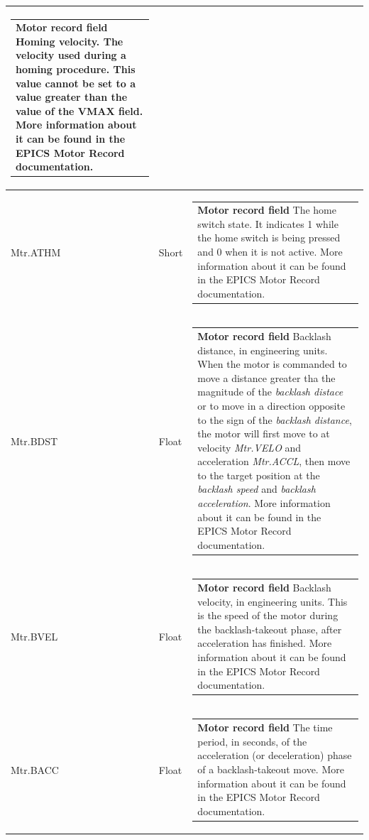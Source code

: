 \documentclass[openany]{article}
\begin{document}
\begin{longtable}{| m{4.5cm} m{2.5cm}  m{8.5cm} |}
\begin{tabular}{@{}m{6cm}@{}}
                \textbf{\color{ForestGreen} Motor record field} Homing velocity. The velocity used during a homing procedure. This value cannot be set to a value greater than the value of the VMAX field. More information about it can be found in the EPICS Motor Record documentation.
            \end{tabular} \hypertarget{pv:mtr-athm}{}\\ \hline
        Mtr.ATHM & Short & \begin{tabular}{@{}m{6cm}@{}}
                \textbf{\color{ForestGreen} Motor record field} The home switch state. It indicates 1 while the home switch is being pressed and 0 when it is not active. More information about it can be found in the EPICS Motor Record documentation.
            \end{tabular} \hypertarget{pv:mtr-bdst}{}\\ \hline
        Mtr.BDST & Float & \begin{tabular}{@{}m{6cm}@{}}
                \textbf{\color{ForestGreen} Motor record field} Backlash distance, in engineering units. When the motor is commanded to move a distance greater tha  the magnitude of the \emph{backlash distace} or to move in a direction opposite to the sign of the \emph{backlash distance}, the motor will first move to $target - backlash$ at velocity \emph{Mtr.VELO} and acceleration \emph{Mtr.ACCL}, then move to the target position at the \emph{backlash speed} and \emph{backlash acceleration}. More information about it can be found in the EPICS Motor Record documentation.
            \end{tabular} \hypertarget{pv:mtr-bvel}{}\\ \hline
        Mtr.BVEL & Float & \begin{tabular}{@{}m{6cm}@{}}
                \textbf{\color{ForestGreen} Motor record field} Backlash velocity, in engineering units. This is the speed of the motor during the backlash-takeout phase, after acceleration has finished. More information about it can be found in the EPICS Motor Record documentation.
            \end{tabular} \hypertarget{pv:mtr-bacc}{}\\ \hline
        Mtr.BACC & Float & \begin{tabular}{@{}m{6cm}@{}}
                \textbf{\color{ForestGreen} Motor record field} The time period, in seconds, of the acceleration (or deceleration) phase of a backlash-takeout move. More information about it can be found in the EPICS Motor Record documentation.

\end{tabular}
\end{longtable}
\end{document}
